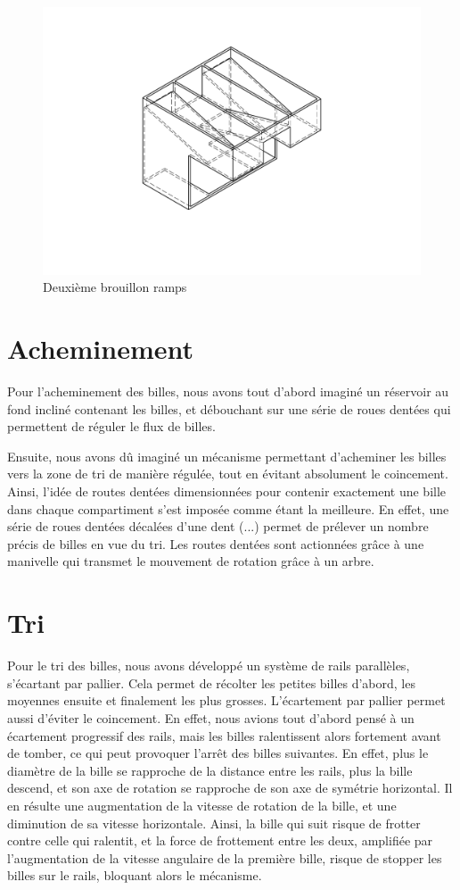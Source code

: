\begin{figure}
    \centering
    \includegraphics[width=\textwidth]{Graphics/DEUXIEME_BROUILLON_2.pdf}
    \caption{Deuxième brouillon ramps}
\end{figure}

\section{Acheminement}
Pour l'acheminement des billes, nous avons tout d'abord imaginé un réservoir au fond incliné contenant les billes, et débouchant sur une série de roues dentées qui permettent de réguler le flux de billes.

Ensuite, nous avons dû imaginé un mécanisme permettant d'acheminer les billes vers la zone de tri de manière régulée, tout en évitant absolument le coincement. Ainsi, l'idée de routes dentées dimensionnées pour contenir exactement une bille dans chaque compartiment s'est imposée comme étant la meilleure. En effet, une série de roues dentées décalées d'une dent (...) permet de prélever un nombre précis de billes en vue du tri.
Les routes dentées sont actionnées grâce à une manivelle qui transmet le mouvement de rotation grâce à un arbre.

\section{Tri}
Pour le tri des billes, nous avons développé un système de rails parallèles, s'écartant par pallier. Cela permet de récolter les petites billes d'abord, les moyennes ensuite et finalement les plus grosses. L'écartement par pallier permet aussi d'éviter le coincement. En effet, nous avions tout d'abord pensé à un écartement progressif des rails, mais les billes ralentissent alors fortement avant de tomber, ce qui peut provoquer l'arrêt des billes suivantes. En effet, plus le diamètre de la bille se rapproche de la distance entre les rails, plus la bille descend, et son axe de rotation se rapproche de son axe de symétrie horizontal. Il en résulte une augmentation de la vitesse de rotation de la bille, et une diminution de sa vitesse horizontale. Ainsi, la bille qui suit risque de frotter contre celle qui ralentit, et la force de frottement entre les deux, amplifiée par l'augmentation de la vitesse angulaire de la première bille, risque de stopper les billes sur le rails, bloquant alors le mécanisme.